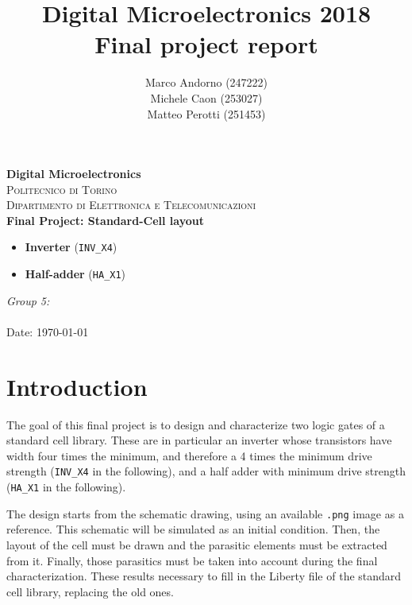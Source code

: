 \documentclass[a4paper]{article}
\title{Digital Microelectronics 2018 \\ Final project report}
\author{Marco Andorno (247222)\\ Michele Caon (253027) \\ Matteo Perotti (251453)}
\newcommand{\inv}{\texttt{INV\_X4}\xspace}
\newcommand{\ha}{\texttt{HA\_X1}\xspace}
\begin{document}
\begin{center}

\thispagestyle{empty}

\textbf{\Large Digital Microelectronics}\\[1.0cm]
\textsc{\Large Politecnico di Torino}\\[0.5cm]
\textsc{\large Dipartimento di Elettronica e Telecomunicazioni}\\[1cm]

\huge \textbf{Final Project: Standard-Cell layout\\}
\begin{itemize}
	\centering
	\item \huge \textbf{Inverter} (\inv)
	\item \huge \textbf{Half-adder} (\ha)
\end{itemize}
\end{center}

\vfill
\large
\begin{flushleft}
\makeatletter
\emph{Group 5:}\\
\@author \\
\vspace{1cm}
\normalsize Date: \today
\makeatother
\end{flushleft}


\newpage

\pagestyle{fancy}
\lhead{}
\chead{}
\rhead{\leftmark}
\lfoot{\thepage}
\cfoot{}
\rfoot{}
\renewcommand{\headrulewidth}{0.3pt}
\renewcommand{\footrulewidth}{0.3pt}

\tableofcontents

\section{Introduction}
\label{sec:intro}
The goal of this final project is to design and characterize two logic gates of a standard cell library. These are in particular an inverter whose transistors have width four times the minimum, and therefore a 4 times the minimum drive strength (\inv in the following), and a half adder with minimum drive strength (\ha in the following).

The design starts from the schematic drawing, using an available \texttt{.png} image as a reference. This schematic will be simulated as an initial condition. Then, the layout of the cell must be drawn and the parasitic elements must be extracted from it. Finally, those parasitics must be taken into account during the final characterization. These results necessary to fill in the Liberty file of the standard cell library, replacing the old ones.
\end{document}
